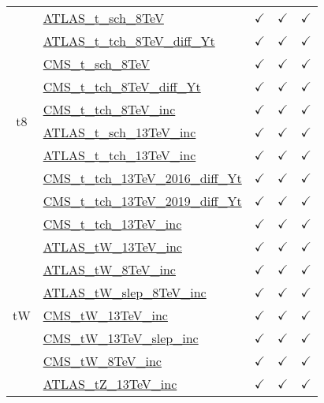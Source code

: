 \documentclass{article}
\begin{document}
\begin{longtable}{|c|l|c|c|c|}
\\ \hline
\multirow{10}{*}{t8}
 & \href{https://arxiv.org}{ATLAS_t_sch_8TeV}  & $\checkmark$ & $\checkmark$ & $\checkmark$\\ \cline{2-5}
 & \href{https://arxiv.org}{ATLAS_t_tch_8TeV_diff_Yt}  & $\checkmark$ & $\checkmark$ & $\checkmark$\\ \cline{2-5}
 & \href{https://arxiv.org}{CMS_t_sch_8TeV}  & $\checkmark$ & $\checkmark$ & $\checkmark$\\ \cline{2-5}
 & \href{https://arxiv.org}{CMS_t_tch_8TeV_diff_Yt}  & $\checkmark$ & $\checkmark$ & $\checkmark$\\ \cline{2-5}
 & \href{https://arxiv.org}{CMS_t_tch_8TeV_inc}  & $\checkmark$ & $\checkmark$ & $\checkmark$\\ \cline{2-5}
 & \href{https://arxiv.org}{ATLAS_t_sch_13TeV_inc}  & $\checkmark$ & $\checkmark$ & $\checkmark$\\ \cline{2-5}
 & \href{https://arxiv.org}{ATLAS_t_tch_13TeV_inc}  & $\checkmark$ & $\checkmark$ & $\checkmark$\\ \cline{2-5}
 & \href{https://arxiv.org}{CMS_t_tch_13TeV_2016_diff_Yt}  & $\checkmark$ & $\checkmark$ & $\checkmark$\\ \cline{2-5}
 & \href{https://arxiv.org}{CMS_t_tch_13TeV_2019_diff_Yt}  & $\checkmark$ & $\checkmark$ & $\checkmark$\\ \cline{2-5}
 & \href{https://arxiv.org}{CMS_t_tch_13TeV_inc}  & $\checkmark$ & $\checkmark$ & $\checkmark$
\\ \hline
\multirow{11}{*}{tW}
 & \href{https://arxiv.org}{ATLAS_tW_13TeV_inc}  & $\checkmark$ & $\checkmark$ & $\checkmark$\\ \cline{2-5}
 & \href{https://arxiv.org}{ATLAS_tW_8TeV_inc}  & $\checkmark$ & $\checkmark$ & $\checkmark$\\ \cline{2-5}
 & \href{https://arxiv.org}{ATLAS_tW_slep_8TeV_inc}  & $\checkmark$ & $\checkmark$ & $\checkmark$\\ \cline{2-5}
 & \href{https://arxiv.org}{CMS_tW_13TeV_inc}  & $\checkmark$ & $\checkmark$ & $\checkmark$\\ \cline{2-5}
 & \href{https://arxiv.org}{CMS_tW_13TeV_slep_inc}  & $\checkmark$ & $\checkmark$ & $\checkmark$\\ \cline{2-5}
 & \href{https://arxiv.org}{CMS_tW_8TeV_inc}  & $\checkmark$ & $\checkmark$ & $\checkmark$\\ \cline{2-5}
 & \href{https://arxiv.org}{ATLAS_tZ_13TeV_inc}  & $\checkmark$ & $\checkmark$ & $\checkmark$\\ \cline{2-5}

\end{longtable}
\end{document}
